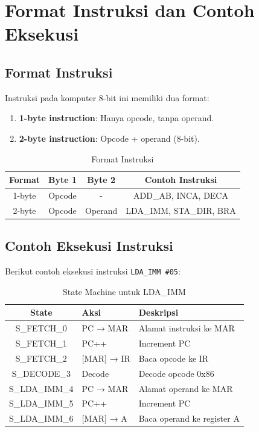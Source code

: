 \documentclass[12pt,a4paper]{report}
\begin{document}
\section{Format Instruksi dan Contoh Eksekusi}

\subsection{Format Instruksi}

Instruksi pada komputer 8-bit ini memiliki dua format:

\begin{enumerate}
  \item \textbf{1-byte instruction}: Hanya opcode, tanpa operand.
  \item \textbf{2-byte instruction}: Opcode + operand (8-bit).
\end{enumerate}

\begin{table}[H]
  \centering
  \small
  \begin{tabular}{|c|c|c|c|}
    \hline
    \textbf{Format} & \textbf{Byte 1} & \textbf{Byte 2} & \textbf{Contoh Instruksi} \\
    \hline
    1-byte & Opcode & - & ADD\_AB, INCA, DECA \\
    2-byte & Opcode & Operand & LDA\_IMM, STA\_DIR, BRA \\
    \hline
  \end{tabular}
  \caption{Format Instruksi}
\end{table}

\subsection{Contoh Eksekusi Instruksi}

Berikut contoh eksekusi instruksi \texttt{LDA\_IMM \#05}:

\begin{table}[H]
  \centering
  \small
  \begin{tabular}{|c|l|l|}
    \hline
    \textbf{State} & \textbf{Aksi} & \textbf{Deskripsi} \\
    \hline
    S\_FETCH\_0 & PC → MAR & Alamat instruksi ke MAR \\
    S\_FETCH\_1 & PC++ & Increment PC \\
    S\_FETCH\_2 & [MAR] → IR & Baca opcode ke IR \\
    S\_DECODE\_3 & Decode & Decode opcode 0x86 \\
    S\_LDA\_IMM\_4 & PC → MAR & Alamat operand ke MAR \\
    S\_LDA\_IMM\_5 & PC++ & Increment PC \\
    S\_LDA\_IMM\_6 & [MAR] → A & Baca operand ke register A \\
    \hline
  \end{tabular}
  \caption{State Machine untuk LDA\_IMM}
\end{table}
\end{document}
